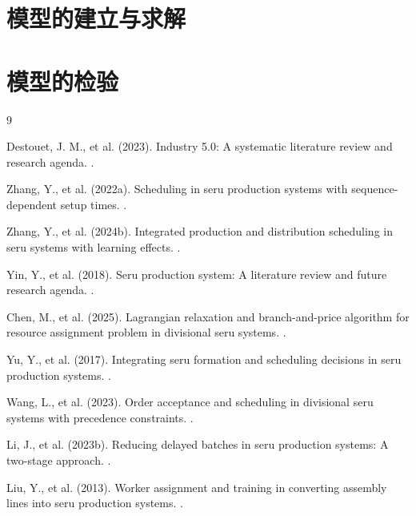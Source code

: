 \documentclass[withoutpreface,bwprint]{cumcmthesis} %
\begin{document}
\section{模型的建立与求解}

\section{模型的检验}


\begin{thebibliography}{9}%
   
Destouet, J. M., et al. (2023). 
\newblock Industry 5.0: A systematic literature review and research agenda.
.

Zhang, Y., et al. (2022a). 
\newblock Scheduling in seru production systems with sequence-dependent setup times.
.

Zhang, Y., et al. (2024b). 
\newblock Integrated production and distribution scheduling in seru systems with learning effects.
.

Yin, Y., et al. (2018). 
\newblock Seru production system: A literature review and future research agenda.
.

Chen, M., et al. (2025). 
\newblock Lagrangian relaxation and branch-and-price algorithm for resource assignment problem in divisional seru systems.
.

Yu, Y., et al. (2017). 
\newblock Integrating seru formation and scheduling decisions in seru production systems.
.

Wang, L., et al. (2023). 
\newblock Order acceptance and scheduling in divisional seru systems with precedence constraints.
.

Li, J., et al. (2023b). 
\newblock Reducing delayed batches in seru production systems: A two-stage approach.
.

Liu, Y., et al. (2013). 
\newblock Worker assignment and training in converting assembly lines into seru production systems.
.


\end{thebibliography}
\end{document}
